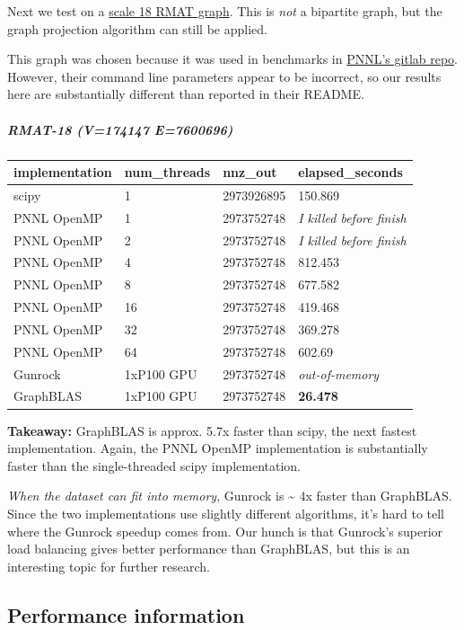 \documentclass[10pt,oneside]{memoir}
\let\oldsubparagraph\subparagraph
\renewcommand{\subparagraph}[1]{\oldsubparagraph{#1}\mbox{}}
\begin{document}
Next we test on a
\href{https://graphchallenge.s3.amazonaws.com/synthetic/graph500-scale18-ef16/graph500-scale18-ef16_adj.tsv.gz}{scale
18 RMAT graph}. This is \emph{not} a bipartite graph, but the graph
projection algorithm can still be applied.

This graph was chosen because it was used in benchmarks in
\href{https://gitlab.hiveprogram.com/jfiroz/graph_projection}{PNNL's
gitlab repo}. However, their command line parameters appear to be
incorrect, so our results here are substantially different than reported
in their README.

\hypertarget{rmat-18-v174147-e7600696}{%
\subparagraph{RMAT-18 (\textbar{}V\textbar{}=174147
\textbar{}E\textbar{}=7600696)}\label{rmat-18-v174147-e7600696}}

\begin{longtable}[]{@{}llll@{}}
\toprule
implementation & num\_threads & nnz\_out &
elapsed\_seconds\tabularnewline
\midrule
\endhead
scipy & 1 & 2973926895 & 150.869\tabularnewline
PNNL OpenMP & 1 & 2973752748 & \emph{I killed before
finish}\tabularnewline
PNNL OpenMP & 2 & 2973752748 & \emph{I killed before
finish}\tabularnewline
PNNL OpenMP & 4 & 2973752748 & 812.453\tabularnewline
PNNL OpenMP & 8 & 2973752748 & 677.582\tabularnewline
PNNL OpenMP & 16 & 2973752748 & 419.468\tabularnewline
PNNL OpenMP & 32 & 2973752748 & 369.278\tabularnewline
PNNL OpenMP & 64 & 2973752748 & 602.69\tabularnewline
Gunrock & 1xP100 GPU & 2973752748 & \emph{out-of-memory}\tabularnewline
GraphBLAS & 1xP100 GPU & 2973752748 & \textbf{26.478}\tabularnewline
\bottomrule
\end{longtable}

\textbf{Takeaway:} GraphBLAS is approx. 5.7x faster than scipy, the next
fastest implementation. Again, the PNNL OpenMP implementation is
substantially faster than the single-threaded scipy implementation.

\emph{When the dataset can fit into memory}, Gunrock is
\textasciitilde{} 4x faster than GraphBLAS. Since the two
implementations use slightly different algorithms, it's hard to tell
where the Gunrock speedup comes from. Our hunch is that Gunrock's
superior load balancing gives better performance than GraphBLAS, but
this is an interesting topic for further research.

\hypertarget{performance-information}{%
\subsection{Performance information}\label{performance-information}}
\end{document}
